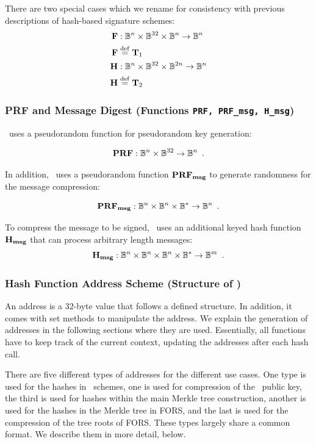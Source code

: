 There are two special cases which we rename for consistency with previous descriptions of hash-based signature schemes:
\begin{align*}
    \mathbf{F}& : \mathbb{B}^{n}\times \mathbb{B}^{32}\times \mathbb{B}^{n}\rightarrow \mathbb{B}^{n} \\
    \mathbf{F}& \stackrel{\rm def}{=} \mathbf{T}_1\\
    \mathbf{H}& : \mathbb{B}^{n}\times \mathbb{B}^{32}\times \mathbb{B}^{2n}\rightarrow \mathbb{B}^{n} \\
    \mathbf{H}& \stackrel{\rm def}{=} \mathbf{T}_2
\end{align*}

\subsubsection{PRF and Message Digest (Functions \texttt{PRF, PRF\_msg, H\_msg})}

\SPHINCSA\ uses a pseudorandom function \PRF for pseudorandom key generation:

\[\mathbf{PRF} : \mathbb{B}^{n}\times \mathbb{B}^{32}\rightarrow \mathbb{B}^{n} \enspace.\]

In addition, \SPHINCSA\ uses a pseudorandom function $\mathbf{PRF_{msg}}$ to generate randomness for the message compression:

\[\mathbf{PRF_{msg}} : \mathbb{B}^{n}\times \mathbb{B}^{n}\times \mathbb{B}^{*}\rightarrow \mathbb{B}^{n} \enspace.\]

To compress the message to be signed, \SPHINCSA\ uses an additional keyed hash function $\mathbf{H_{msg}}$ that can process arbitrary length messages:
\[ \mathbf{H_{msg}} : \mathbb{B}^{n}\times \mathbb{B}^{n}\times \mathbb{B}^{n}\times \mathbb{B}^{*}\rightarrow \mathbb{B}^{m} \enspace.\]

\subsubsection{Hash Function Address Scheme (Structure of {\ADRS})} \label{sec:addr}

An address \ADRS is a 32-byte value that follows a defined structure. In addition, it comes with set methods to manipulate the address. We explain the generation of addresses in the following sections where they are used. Essentially, all functions have to keep track of the current context, updating the addresses after each hash call.

There are five different types of addresses for the different use cases. One type is used for the hashes in \WOTSCS\ schemes, one is used for compression of the \WOTSCS\ public key, the third is used for hashes within the main Merkle tree construction, another is used for the hashes in the Merkle tree in FORS, and the last is used for the compression of the tree roots of FORS. These types largely share a common format. We describe them in more detail, below.

